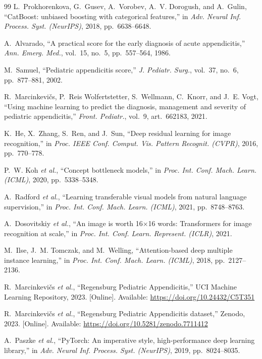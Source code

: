 \documentclass[journal]{IEEEtran}
\begin{document}
\begin{thebibliography}{99}
 L.~Prokhorenkova, G.~Gusev, A.~Vorobev, A.~V.
Dorogush, and A.~Gulin, ``CatBoost: unbiased boosting with categorical features,'' in
\emph{Adv. Neural Inf. Process. Syst. (NeurIPS)}, 2018, pp.~6638--6648.

 A.~Alvarado, ``A practical score for the early diagnosis
of acute appendicitis,'' \emph{Ann. Emerg. Med.}, vol.~15, no.~5, pp.~557--564, 1986.

 M.~Samuel, ``Pediatric appendicitis score,'' \emph{J.
Pediatr. Surg.}, vol.~37, no.~6, pp.~877--881, 2002.

 R.~Marcinkevi\v{c}s, P.~Reis Wolfertstetter,
S.~Wellmann, C.~Knorr, and J.~E. Vogt, ``Using machine learning to predict the
diagnosis, management and severity of pediatric appendicitis,'' \emph{Front. Pediatr.},
vol.~9, art.~662183, 2021.

 K.~He, X.~Zhang, S.~Ren, and J.~Sun, ``Deep residual learning for
image recognition,'' in \emph{Proc. IEEE Conf. Comput. Vis. Pattern Recognit. (CVPR)},
2016, pp.~770--778.

 P.~W. Koh \emph{et al.}, ``Concept bottleneck models,'' in
\emph{Proc. Int. Conf. Mach. Learn. (ICML)}, 2020, pp.~5338--5348.

 A.~Radford \emph{et al.}, ``Learning transferable visual
models from natural language supervision,'' in \emph{Proc. Int. Conf. Mach. Learn.
(ICML)}, 2021, pp.~8748--8763.

 A.~Dosovitskiy \emph{et al.}, ``An image is worth
16$\times$16 words: Transformers for image recognition at scale,'' in \emph{Proc. Int.
Conf. Learn. Represent. (ICLR)}, 2021.

 M.~Ilse, J.~M. Tomczak, and M.~Welling, ``Attention-based
deep multiple instance learning,'' in \emph{Proc. Int. Conf. Mach. Learn. (ICML)}, 2018,
pp.~2127--2136.

 R.~Marcinkevi\v{c}s \emph{et al.}, ``Regensburg Pediatric
Appendicitis,'' UCI Machine Learning Repository, 2023. [Online]. Available:
\url{https://doi.org/10.24432/C5T351}

 R.~Marcinkevi\v{c}s \emph{et al.}, ``Regensburg Pediatric
Appendicitis dataset,'' Zenodo, 2023. [Online]. Available:
\url{https://doi.org/10.5281/zenodo.7711412}

 A.~Paszke \emph{et al.}, ``PyTorch: An imperative style,
high-performance deep learning library,'' in \emph{Adv. Neural Inf. Process. Syst.
(NeurIPS)}, 2019, pp.~8024--8035.


\end{thebibliography}
\end{document}
